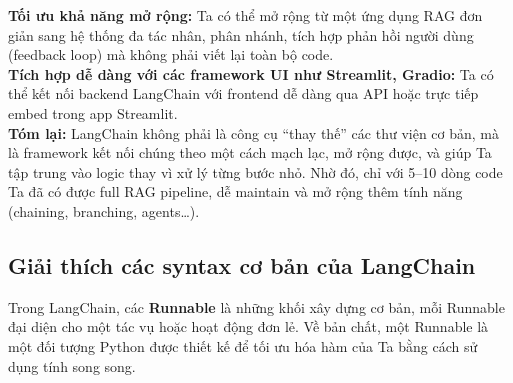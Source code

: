\documentclass[11pt]{article}
\begin{document}
\noindent
\textbf{Tối ưu khả năng mở rộng:}
Ta có thể mở rộng từ một ứng dụng RAG đơn giản sang hệ thống đa tác nhân, phân nhánh, tích hợp phản hồi người dùng (feedback loop) mà không phải viết lại toàn bộ code. \\ 

\noindent
\textbf{Tích hợp dễ dàng với các framework UI như Streamlit, Gradio:}
Ta có thể kết nối backend LangChain với frontend dễ dàng qua API hoặc trực tiếp embed trong app Streamlit. \\ 

\noindent
\textbf{Tóm lại:} LangChain không phải là công cụ “thay thế” các thư viện cơ bản, mà là framework kết nối chúng theo một cách mạch lạc, mở rộng được, và giúp Ta tập trung vào logic thay vì xử lý từng bước nhỏ. Nhờ đó, chỉ với 5–10 dòng code Ta đã có được full RAG pipeline, dễ maintain và mở rộng thêm tính năng (chaining, branching, agents…).

\subsection{Giải thích các syntax cơ bản của LangChain}
Trong LangChain, các \textbf{Runnable} là những khối xây dựng cơ bản, mỗi Runnable đại diện cho một tác vụ hoặc hoạt động đơn lẻ. Về bản chất, một Runnable là một đối tượng Python được thiết kế để tối ưu hóa hàm của Ta bằng cách sử dụng tính song song.
\end{document}
